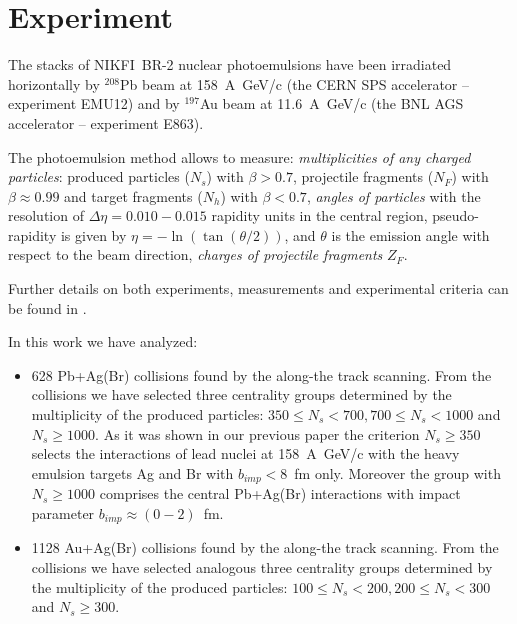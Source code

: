 \documentclass[12pt]{article}
\begin{document}

\section{Experiment}

The stacks of NIKFI~BR-2 nuclear photoemulsions have been irradiated horizontally by ${}^{208}$Pb beam at 158~A~GeV/c (the CERN SPS accelerator -- experiment EMU12) and by ${}^{197}$Au beam at 11.6~A~GeV/c (the BNL AGS accelerator -- experiment E863). 

The photoemulsion method allows to measure:
      \textit{multiplicities of any charged particles}: 
      produced particles ($N_s$) with $\beta > 0.7$, 
      projectile fragments ($N_F$) with $\beta \approx 0.99$ 
      and target fragments ($N_h$) with $\beta < 0.7$,
      \textit{angles of particles} with the resolution of $\Delta\eta = 0.010-0.015$ 
      rapidity units in the central region, pseudo-rapidity 
      is given by $\eta = -\ln(\tan(\theta/2))$, and $\theta$ is the emission angle 
      with respect to the beam direction,
      \textit{charges of projectile fragments} $Z_F$. 


Further details on both experiments, measurements and experimental criteria can be found in \cite{bib15,bib16}.

In this work we have analyzed:
\begin{itemize}
\item 628 Pb+Ag(Br) collisions found by the along-the track scanning. From the collisions we have 
      selected three centrality groups determined by the multiplicity of the produced particles:
      $350 \leq N_s < 700, 700 \leq N_s < 1000$ and $N_s \geq 1000$. As it was shown in our
      previous paper \cite{bib18} the criterion $N_s \geq 350$ selects the interactions 
      of lead nuclei at 158~A~GeV/c with the heavy emulsion targets Ag and Br with $b_{imp} < 8
      $~fm only. Moreover the group with $N_s \geq 1000$ comprises the central Pb+Ag(Br)
      interactions with impact parameter $b_{imp} \approx (0 - 2)$~fm.

\item 1128 Au+Ag(Br) collisions found by the along-the track scanning. From the collisions we have
      selected analogous three centrality groups determined by the multiplicity of the produced
      particles: $100 \leq N_s < 200, 200 \leq N_s < 300$ and $N_s \geq 300$.
\end{itemize}
\end{document}
